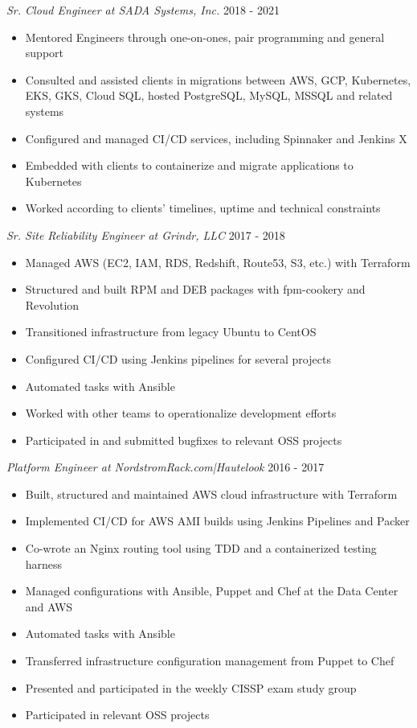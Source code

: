 \documentclass[line]{docs/resume/res}
\begin{document}
\begin{resume}
  {\sl Sr. Cloud Engineer at SADA Systems, Inc.} \hfill 2018 - 2021
  \begin{itemize} \itemsep -2pt
    \item Mentored Engineers through one-on-ones, pair programming and general support
    \item Consulted and assisted clients in migrations between AWS, GCP, Kubernetes, \\
      EKS, GKS, Cloud SQL, hosted PostgreSQL, MySQL, MSSQL and related systems
    \item Configured and managed CI/CD services, including Spinnaker and Jenkins X
    \item Embedded with clients to containerize and migrate applications to Kubernetes
    \item Worked according to clients' timelines, uptime and technical constraints
  \end{itemize}

  {\sl Sr. Site Reliability Engineer at Grindr, LLC} \hfill 2017 - 2018
  \begin{itemize} \itemsep -2pt %
    \item Managed AWS (EC2, IAM, RDS, Redshift, Route53, S3, etc.) with Terraform
    \item Structured and built RPM and DEB packages with fpm-cookery and Revolution
    \item Transitioned infrastructure from legacy Ubuntu to CentOS
    \item Configured CI/CD using Jenkins pipelines for several projects
    \item Automated tasks with Ansible
    \item Worked with other teams to operationalize development efforts
    \item Participated in and submitted bugfixes to relevant OSS projects
  \end{itemize}

  {\sl Platform Engineer at NordstromRack.com|Hautelook} \hfill 2016 - 2017
  \begin{itemize} \itemsep -2pt %
    \item Built, structured and maintained AWS cloud infrastructure with Terraform
    \item Implemented CI/CD for AWS AMI builds using Jenkins Pipelines and Packer
    \item Co-wrote an Nginx routing tool using TDD and a containerized testing harness
    \item Managed configurations with Ansible, Puppet and Chef at the Data Center and AWS
    \item Automated tasks with Ansible
    \item Transferred infrastructure configuration management from Puppet to Chef
    \item Presented and participated in the weekly CISSP exam study group
    \item Participated in relevant OSS projects
  \end{itemize}


\end{resume}
\end{document}

